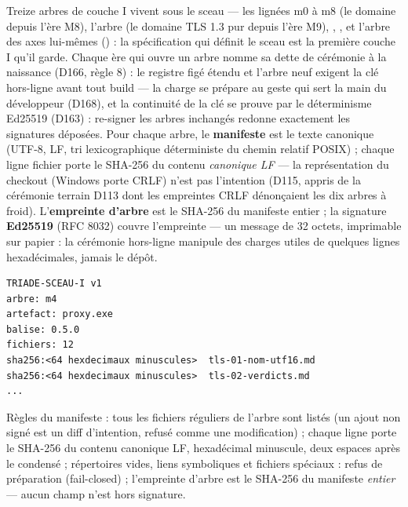 Treize arbres de couche I vivent sous le sceau — les lignées m0 à m8 (le domaine
 depuis l'ère M8), l'arbre  (le domaine TLS 1.3 pur depuis
l'ère M9), , , et l'arbre des axes lui-mêmes
() : la spécification qui définit le sceau est la première couche I
qu'il garde. Chaque ère qui ouvre un arbre nomme sa dette de cérémonie à la
naissance (D166, règle 8) : le registre figé étendu et l'arbre neuf exigent la clé
hors-ligne avant tout build — la charge se prépare au geste qui sert la main du
développeur (D168), et la continuité de la clé se prouve par le déterminisme
Ed25519 (D163) : re-signer les arbres inchangés redonne exactement les signatures
déposées. Pour chaque arbre, le \textbf{manifeste} est le texte
canonique (UTF-8, LF, tri lexicographique déterministe du chemin relatif POSIX) ; chaque
ligne fichier porte le SHA-256 du contenu \emph{canonique LF} — la représentation du
checkout (Windows  porte CRLF) n'est pas l'intention (D115, appris de la
cérémonie terrain D113 dont les empreintes CRLF dénonçaient les dix arbres à froid).
L'\textbf{empreinte d'arbre} est le SHA-256 du manifeste entier ; la signature
\textbf{Ed25519} (RFC 8032) couvre l'empreinte — un message de 32 octets, imprimable
sur papier : la cérémonie hors-ligne manipule des charges utiles de quelques lignes
hexadécimales, jamais le dépôt.

\begin{lstlisting}
TRIADE-SCEAU-I v1
arbre: m4
artefact: proxy.exe
balise: 0.5.0
fichiers: 12
sha256:<64 hexdecimaux minuscules>  tls-01-nom-utf16.md
sha256:<64 hexdecimaux minuscules>  tls-02-verdicts.md
...
\end{lstlisting}

Règles du manifeste : tous les fichiers réguliers de l'arbre sont listés (un ajout non
signé est un diff d'intention, refusé comme une modification) ; chaque ligne porte le
SHA-256 du contenu canonique LF, hexadécimal minuscule, deux espaces après le condensé ;
répertoires vides, liens symboliques et fichiers spéciaux : refus de préparation
(fail-closed) ; l'empreinte d'arbre est le SHA-256 du manifeste \emph{entier} — aucun
champ n'est hors signature.

